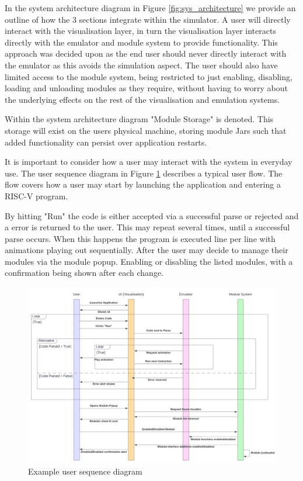 In the system architecture diagram in Figure \ref{fig:sys_architecture} we provide an outline of how the 3 sections integrate within the simulator. A user will directly interact with the visualisation layer, in turn the visualisation layer interacts directly with the emulator and module system to provide functionality. This approach was decided upon as the end user should never directly interact with the emulator as this avoids the simulation aspect. The user should also have limited access to the module system, being restricted to just enabling, disabling, loading and unloading modules as they require, without having to worry about the underlying effects on the rest of the visualisation and emulation systems.

Within the system architecture diagram "Module Storage" is denoted. This storage will exist on the users physical machine, storing  module Jars such that added functionality can persist over application restarts.

It is important to consider how a user may interact with the system in everyday use. The user sequence diagram in Figure \ref{fig:user_sequence} describes a typical user flow. The flow covers how a user may start by launching the application and entering a RISC-V program.

By hitting "Run" the code is either accepted via a successful parse or rejected and a error is returned to the user. This may repeat several times, until a successful parse occurs. When this happens the program is executed line per line with animations playing out sequentially. After the user may decide to manage their modules via the module popup. Enabling or disabling the listed modules, with a confirmation being shown after each change.

\begin{figure}[h]
    \centering
    \includegraphics[width=0.95\linewidth]{dissertation/DATA/sequence diagram.png}
    \caption{Example user sequence diagram}
    \label{fig:user_sequence}
\end{figure}


